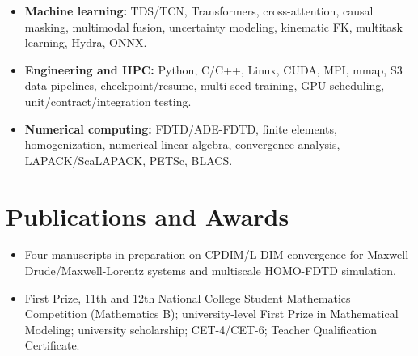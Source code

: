 \documentclass[10pt,letterpaper]{article}
\begin{document}
\begin{itemize}
  \item \textbf{Machine learning:} TDS/TCN, Transformers, cross-attention, causal masking, multimodal fusion, uncertainty modeling, kinematic FK, multitask learning, Hydra, ONNX.
  \item \textbf{Engineering and HPC:} Python, C/C++, Linux, CUDA, MPI, mmap, S3 data pipelines, checkpoint/resume, multi-seed training, GPU scheduling, unit/contract/integration testing.
  \item \textbf{Numerical computing:} FDTD/ADE-FDTD, finite elements, homogenization, numerical linear algebra, convergence analysis, LAPACK/ScaLAPACK, PETSc, BLACS.
\end{itemize}

\section{Publications and Awards}

\begin{itemize}
  \item Four manuscripts in preparation on CPDIM/L-DIM convergence for Maxwell-Drude/Maxwell-Lorentz systems and multiscale HOMO-FDTD simulation.
  \item First Prize, 11th and 12th National College Student Mathematics Competition (Mathematics B); university-level First Prize in Mathematical Modeling; university scholarship; CET-4/CET-6; Teacher Qualification Certificate.
\end{itemize}
\end{document}
